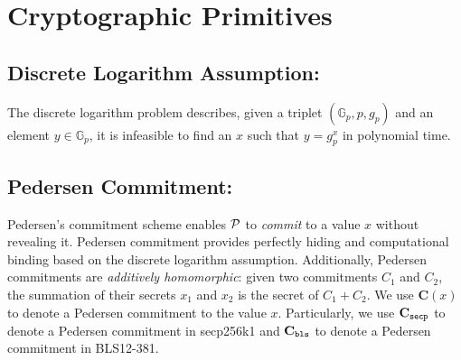 
\section{Cryptographic Primitives}

\subsection{Discrete Logarithm Assumption:}\label{sec:dlp} The discrete logarithm problem describes, given a triplet $(\mathbb{G}_p, p, g_p)$ and an element $y\in\mathbb{G}_p$, it is infeasible to find an $x$ such that $y=g_p^x$ in polynomial time.

\subsection{Pedersen Commitment:}\label{sec:pedersen} Pedersen's commitment scheme \cite{pedersen} enables $\mathcal{P}$ to \textit{commit} to a value $x$ without revealing it. Pedersen commitment provides perfectly hiding and computational binding based on the discrete logarithm assumption. Additionally, Pedersen commitments are \textit{additively homomorphic}: given two commitments $C_1$ and $C_2$, the summation of their secrets $x_1$ and $x_2$ is the secret of $C_1+C_2$. We use $\textbf{C}(x)$ to denote a Pedersen commitment to the value $x$. Particularly, we use $\textbf{C}_\texttt{secp}$ to denote a Pedersen commitment in secp256k1 and $\textbf{C}_\texttt{bls}$ to denote a Pedersen commitment in BLS12-381.

